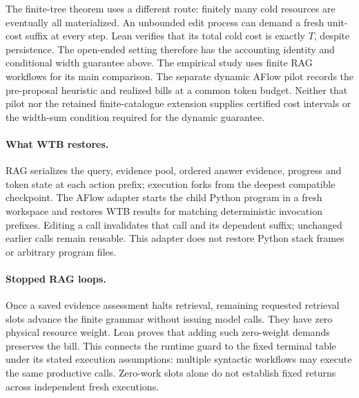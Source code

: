 The finite-tree theorem uses a different route: finitely many cold resources
are eventually all materialized. An unbounded edit process can demand a fresh
unit-cost suffix at every step. Lean verifies that its total cold cost is
exactly $T$, despite persistence. The open-ended setting therefore has the
accounting identity and conditional width guarantee above. The empirical study
uses finite RAG workflows for its main comparison. The separate dynamic AFlow
pilot records the pre-proposal heuristic and realized bills at a common token
budget. Neither that pilot nor the retained finite-catalogue extension supplies
certified cost intervals or the width-sum condition required for the dynamic
guarantee.

\paragraph{What WTB restores.}
RAG serializes the query, evidence pool, ordered answer evidence, progress and
token state at each action prefix; execution forks from the deepest compatible
checkpoint. The AFlow adapter starts the child Python program in a fresh
workspace and restores WTB results for matching deterministic invocation
prefixes. Editing a call invalidates that call and its dependent suffix;
unchanged earlier calls remain reusable. This adapter does not restore Python
stack frames or arbitrary program files.

\paragraph{Stopped RAG loops.}
Once a saved evidence assessment halts retrieval, remaining requested
retrieval slots advance the finite grammar without issuing model calls.
They have zero physical resource weight. Lean proves that adding such
zero-weight demands preserves the bill. This connects the runtime guard to
the fixed terminal table under its stated execution assumptions: multiple
syntactic workflows may execute the same productive calls. Zero-work slots
alone do not establish fixed returns across independent fresh executions.
